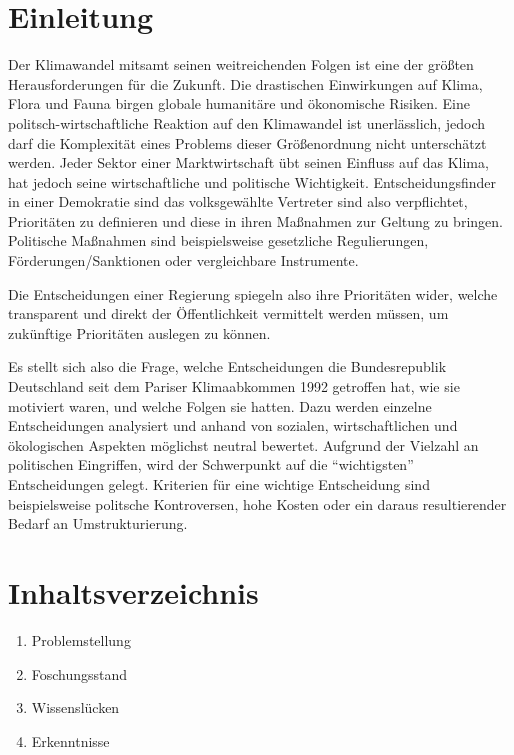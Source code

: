 \documentclass[12pt,a4paper]{article}
\title{\titlename}
\author{ Maylis Grune, Muhammad-Baquier Alrumeil, Nikals Schmidt}
\date{\exposedate}
\begin{document}


\maketitle

\section*{Einleitung}

Der Klimawandel mitsamt seinen weitreichenden Folgen ist  eine der größten Herausforderungen für die Zukunft. 
Die drastischen Einwirkungen auf Klima, Flora und Fauna %
birgen globale humanitäre und ökonomische Risiken. 
Eine politsch-wirtschaftliche Reaktion auf den Klimawandel ist unerlässlich, 
jedoch darf die Komplexität eines Problems dieser Größenordnung nicht unterschätzt werden. Jeder Sektor einer Marktwirtschaft übt seinen 
Einfluss auf das Klima, hat jedoch seine wirtschaftliche und politische Wichtigkeit. 
Entscheidungsfinder \- in einer Demokratie sind das volksgewählte Vertreter \- sind also verpflichtet, Prioritäten zu definieren und diese in 
ihren Maßnahmen zur Geltung zu bringen. Politische Maßnahmen sind beispielsweise gesetzliche Regulierungen, Förderungen/Sanktionen oder vergleichbare Instrumente. 

Die Entscheidungen einer Regierung spiegeln also ihre Prioritäten wider, welche transparent und direkt der Öffentlichkeit vermittelt werden müssen, um zukünftige Prioritäten auslegen zu können. 

Es stellt sich also die Frage, welche Entscheidungen die Bundesrepublik Deutschland seit dem Pariser Klimaabkommen 1992 getroffen hat, wie sie motiviert waren, und welche Folgen sie hatten. Dazu werden einzelne Entscheidungen analysiert und anhand von sozialen, wirtschaftlichen und ökologischen Aspekten möglichst neutral bewertet. 
Aufgrund der Vielzahl an politischen Eingriffen, wird der Schwerpunkt auf die “wichtigsten” Entscheidungen gelegt. Kriterien für eine wichtige Entscheidung sind beispielsweise politsche Kontroversen, hohe Kosten oder ein daraus resultierender Bedarf an Umstrukturierung. 

\section*{Inhaltsverzeichnis}
\begin{enumerate}
	\item Problemstellung
	\item Foschungsstand
	\item Wissenslücken
	\item Erkenntnisse
\end{enumerate}
\end{document}
